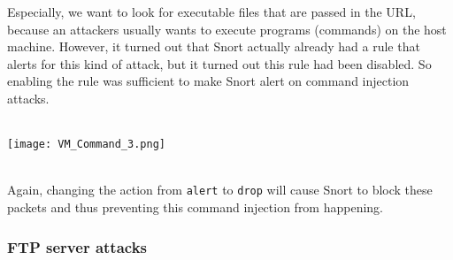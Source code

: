 Especially, we want to look for executable files that are passed in the URL, because an attackers usually wants to execute programs (commands) on the host machine. However, it turned out that Snort actually already had a rule that alerts for this kind of attack, but it turned out this rule had been disabled. So enabling the rule was sufficient to make Snort alert on command injection attacks.
$\;$ \\ \\
\noindent\begin{minipage}{\textwidth}
    \centering
    \texttt{[image: VM\_Command\_3.png]}
\end{minipage}
$\;$ \\ \\
Again, changing the action from \texttt{alert} to \texttt{drop} will cause Snort to block these packets and thus preventing this command injection from happening.

\subsubsection{FTP server attacks}

